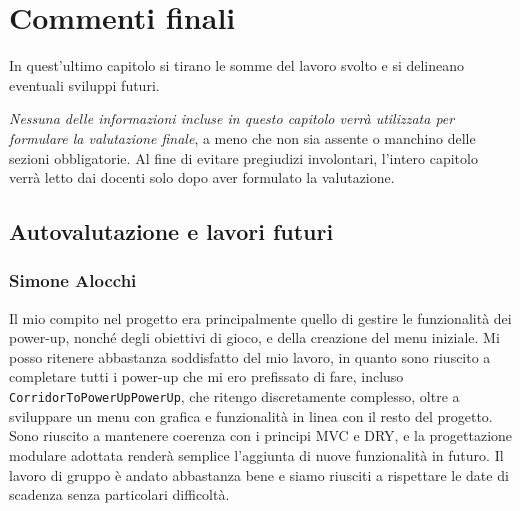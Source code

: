 \documentclass[a4paper,12pt]{report}
\begin{document}
\chapter{Commenti finali}

In quest'ultimo capitolo si tirano le somme del lavoro svolto e si delineano eventuali sviluppi
futuri.

\textit{Nessuna delle informazioni incluse in questo capitolo verrà utilizzata per formulare la valutazione finale}, a meno che non sia assente o manchino delle sezioni obbligatorie.
%
Al fine di evitare pregiudizi involontari, l'intero capitolo verrà letto dai docenti solo dopo aver formulato la valutazione.

\section{Autovalutazione e lavori futuri}

\subsection{Simone Alocchi}
Il mio compito nel progetto era principalmente quello di gestire le funzionalità dei power-up, nonché degli obiettivi di gioco, e della creazione del menu iniziale.  
Mi posso ritenere abbastanza soddisfatto del mio lavoro, in quanto sono riuscito a completare tutti i power-up che mi ero prefissato di fare, incluso \texttt{CorridorToPowerUpPowerUp}, 
che ritengo discretamente complesso, oltre a sviluppare un menu con grafica e funzionalità in linea con il resto del progetto.  
Sono riuscito a mantenere coerenza con i principi MVC e DRY, e la progettazione modulare adottata renderà semplice l’aggiunta di nuove funzionalità in futuro.  
Il lavoro di gruppo è andato abbastanza bene e siamo riusciti a rispettare le date di scadenza senza particolari difficoltà.

\newpage
\end{document}
